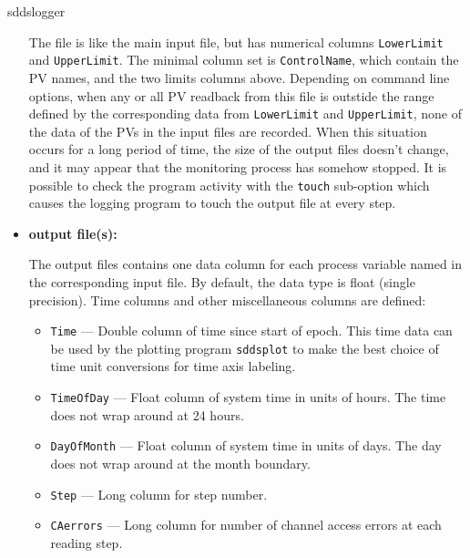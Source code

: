 \begin{sddsprog}{sddslogger}
\begin{itemize}
      The file is like the main input file, but has numerical columns \verb+LowerLimit+ and \verb+UpperLimit+.
      The minimal column set is \verb+ControlName+, which contain the PV names, and the two limits columns above.
      Depending on command line options, when any or all PV readback from this file
      is outstide the range defined by the corresponding data from \verb+LowerLimit+ and \verb+UpperLimit+,
      none of the data of the PVs in the input files are recorded.
      When this situation occurs for a long period of time, the size of the output files doesn't
      change, and it may appear that the monitoring process has somehow stopped.
      It is possible to check the program activity with the \verb+touch+ sub-option
      which causes the logging program to touch the output file at every step.

  \item \textbf{output file(s):}\par
      The output files contains one data column for each process variable named in the corresponding input file. By default,
      the data type is float (single precision).
      Time columns and other miscellaneous columns are defined:
  \begin{itemize}
    \item {\tt Time} --- Double column of time since start of epoch. This time data can be used by
          the plotting program {\verb+sddsplot+} to make the best choice of time unit conversions
          for time axis labeling.
    \item {\tt TimeOfDay} --- Float column of system time in units of hours.
          The time does not wrap around at 24 hours.
    \item {\tt DayOfMonth} --- Float column of system time in units of days.
          The day does not wrap around at the month boundary.
    \item {\tt Step} --- Long column for step number.
    \item {\tt CAerrors} --- Long column for number of channel access errors at each reading step.
  \end{itemize}


\end{itemize}
\end{sddsprog}
